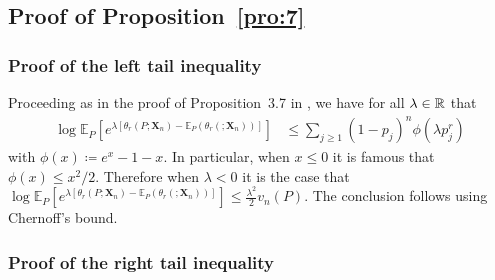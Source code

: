 \documentclass{article}
\newcommand{\1}{\boldsymbol{1}}
\newcommand{\EE}{\mathbb{E}}
\theoremstyle{plain}
\begin{document}
\subsection{Proof of Proposition~\ref{pro:7}}
\label{sec:proof-pro:tail-bounds}

\subsubsection{Proof of the left tail inequality}

  Proceeding as in the proof of Proposition~3.7 in \cite{Ben(17)}, we have for all $\lambda \in \mathbb{R}$ that
  \begin{align*}
    \log \EE_P[e^{\lambda[\theta_r(P;\mathbf{X}_n) - \EE_P(\theta_r(;\mathbf{X}_n))]}]%
    &\leq \sum_{j\geq 1}(1 - p_j)^n\phi(\lambda p_j^r)
  \end{align*}
  with $\phi(x) \coloneqq e^x - 1 - x$. In particular, when $x \leq 0$ it is famous that $\phi(x) \leq x^2/2$. Therefore when $\lambda < 0$ it is the case that $\log\EE_P[e^{\lambda[\theta_r(P;\mathbf{X}_n) - \EE_P(\theta_r(;\mathbf{X}_n))]}] \leq \frac{\lambda^2}{2}v_n(P)$. The conclusion follows using Chernoff's bound.

\subsubsection{Proof of the right tail inequality}
\end{document}
